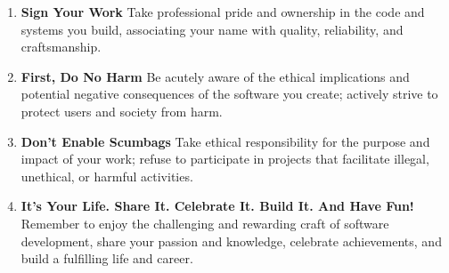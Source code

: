 \documentclass[11pt]{article}
\begin{document}
\begin{tcolorbox}[pragchapterbox={Chapter 9: Pragmatic Projects}]
\begin{multicols}{2}
\begin{enumerate}[label=\arabic*., start=82, itemsep=0.8ex, %
                  topsep=0pt, partopsep=0pt, labelwidth=!, labelindent=0pt, leftmargin=*]
    \item \textbf{Sign Your Work} %
    Take professional pride and ownership in the code and systems you build, associating your name with quality, reliability, and craftsmanship.

    \item \textbf{First, Do No Harm} %
    Be acutely aware of the ethical implications and potential negative consequences of the software you create; actively strive to protect users and society from harm.

    \item \textbf{Don't Enable Scumbags} %
    Take ethical responsibility for the purpose and impact of your work; refuse to participate in projects that facilitate illegal, unethical, or harmful activities.

    \item \textbf{It’s Your Life. Share It. Celebrate It. Build It. And Have Fun!} %
    Remember to enjoy the challenging and rewarding craft of software development, share your passion and knowledge, celebrate achievements, and build a fulfilling life and career.
\end{enumerate}
\end{multicols} %
\end{tcolorbox}


\end{document}
